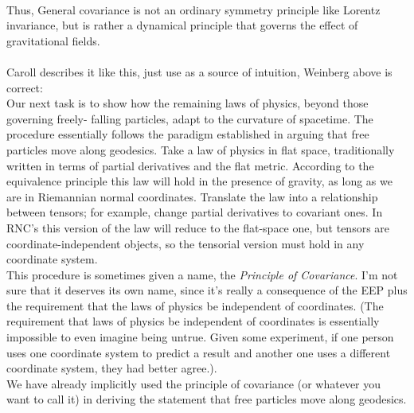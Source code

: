 \\Thus, General covariance is not an ordinary symmetry principle like Lorentz invariance, but is rather a dynamical principle that governs the effect of gravitational fields.\\
\\
Caroll describes it like this, just use as a source of intuition, Weinberg above is correct:\\
Our next task is to show how the remaining laws of physics, beyond those governing freely-
falling particles, adapt to the curvature of spacetime. The procedure essentially follows the
paradigm established in arguing that free particles move along geodesics. Take a law of
physics in flat space, traditionally written in terms of partial derivatives and the flat metric.
According to the equivalence principle this law will hold in the presence of gravity, as long
as we are in Riemannian normal coordinates. Translate the law into a relationship between
tensors; for example, change partial derivatives to covariant ones. In RNC’s this version of
the law will reduce to the flat-space one, but tensors are coordinate-independent objects, so
the tensorial version must hold in any coordinate system.\\
This procedure is sometimes given a name, the \emph{Principle of Covariance}. I’m not
sure that it deserves its own name, since it’s really a consequence of the EEP plus the
requirement that the laws of physics be independent of coordinates. (The requirement that
laws of physics be independent of coordinates is essentially impossible to even imagine being
untrue. Given some experiment, if one person uses one coordinate system to predict a result
and another one uses a different coordinate system, they had better agree.).\\
We have already implicitly used the principle of covariance (or whatever you want to
call it) in deriving the statement that free particles move along geodesics.



